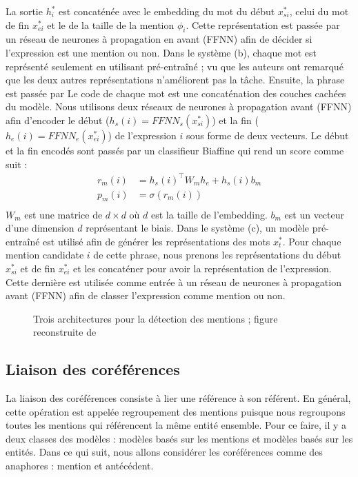 \documentclass{KodeBook}
\begin{document}
La sortie $h^*_i$ est concaténée avec le embedding du mot du début $x^*_{si}$, celui du mot de fin $x^*_{ei}$ et le  de la taille de la mention $\phi_i$.
Cette représentation est passée par un réseau de neurones à propagation en avant (FFNN) afin de décider si l'expression est une mention ou non.
Dans le système (b), chaque mot est représenté seulement en utilisant  pré-entraîné ; vu que les auteurs ont remarqué que les deux autres représentations n'améliorent pas la tâche.
Ensuite, la phrase est passée par 
Le code de chaque mot est une concaténation des couches cachées du modèle.
Nous utilisons deux réseaux de neurones à propagation avant (FFNN) afin d'encoder le début ($ h_s(i) = FFNN_s(x_{si}^*)$) et la fin ($ h_e(i) = FFNN_e(x_{ei}^*)$) de l'expression $i$ sous forme de deux vecteurs. 
Le début et la fin encodés sont passés par un classifieur Biaffine \cite{2017-dozat-manning} qui rend un score comme suit : 
\begin{align*}
r_m(i) & = h_s(i)^\top W_m h_e + h_s(i) b_m \\
p_m(i) & = \sigma(r_m(i)) \\
\end{align*}
$W_m$ est une matrice de $d\times d$ où $d$ est la taille de l'embedding.
$b_m$ est un vecteur d'une dimension $d$ représentant le biais.
Dans le système (c), un modèle  pré-entraîné est utilisé afin de générer les représentations des mots $x^*_t$. 
Pour chaque mention candidate $i$ de cette phrase, nous prenons les représentations du début $x^*_{si}$ et de fin $x^*_{ei}$ et les concaténer pour avoir la représentation de l'expression. 
Cette dernière est utilisée comme entrée à un réseau de neurones à propagation avant (FFNN) afin de classer l'expression comme mention ou non. 

\begin{figure}[ht]
	\centering
	\caption[Trois architectures pour la détection des mentions]{Trois architectures pour la détection des mentions ; figure reconstruite de \cite{2020-yu-al}}
	\label{fig:det-mention-yu}
\end{figure}

\subsection{Liaison des coréférences}

La liaison des coréférences consiste à lier une référence à son référent. 
En général, cette opération est appelée regroupement des mentions puisque nous regroupons toutes les mentions qui référencent la même entité ensemble. 
Pour ce faire, il y a deux classes des modèles : modèles basés sur les mentions et modèles basés sur les entités. 
Dans ce qui suit, nous allons considérer les coréférences comme des anaphores : mention et antécédent.
\end{document}
